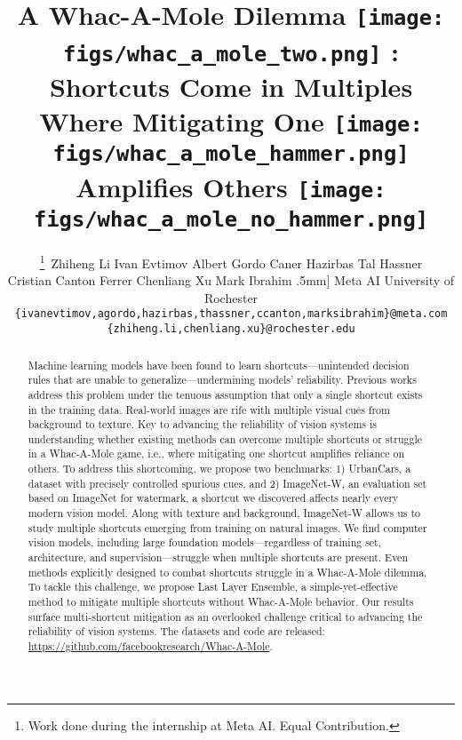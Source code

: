 \documentclass[10pt,twocolumn,letterpaper]{article}
\DeclareRobustCommand{\mole}{\begingroup\normalfont
  \texttt{[image: figs/whac\_a\_mole\_two.png]}\endgroup
}
\DeclareRobustCommand{\molehammer}{\begingroup\normalfont
  \texttt{[image: figs/whac\_a\_mole\_hammer.png]}\endgroup
}
\DeclareRobustCommand{\molenohammer}{\begingroup\normalfont
  \texttt{[image: figs/whac\_a\_mole\_no\_hammer.png]}\endgroup
}
\begin{document}
\title{
\vspace{-11mm} A Whac-A-Mole Dilemma \mole:\\
Shortcuts Come in Multiples Where Mitigating One \molehammer{} Amplifies Others \molenohammer  \vspace{-6mm}
}

\author{
\thanks{Work done during the internship at Meta AI. Equal Contribution.}~Zhiheng Li
\quad Ivan Evtimov
\quad Albert Gordo
\quad Caner Hazirbas
\quad Tal Hassner \\
Cristian Canton Ferrer
\quad Chenliang Xu
\quad Mark Ibrahim \0.5mm]
Meta AI \quad University of Rochester \\
{\tt\small \{ivanevtimov,agordo,hazirbas,thassner,ccanton,marksibrahim\}@meta.com} \\
{\tt\small \{zhiheng.li,chenliang.xu\}@rochester.edu} \vspace{-5mm}
}
\maketitle




\begin{abstract}
Machine learning models have been found to learn shortcuts---unintended decision rules that are unable to generalize---undermining models' reliability. Previous works address this problem under the tenuous assumption that only a single shortcut exists in the training data. Real-world images are rife with multiple visual cues from background to texture. Key to advancing the reliability of vision systems is understanding whether existing methods can overcome multiple shortcuts or struggle in a Whac-A-Mole game, i.e., where mitigating one shortcut amplifies reliance on others. To address this shortcoming, we propose two benchmarks: 1) UrbanCars, a dataset with precisely controlled spurious cues, and 2) ImageNet-W, an evaluation set based on ImageNet for watermark, a shortcut we discovered affects nearly every modern vision model. Along with texture and background, ImageNet-W allows us to study multiple shortcuts emerging from training on natural images. We find computer vision models, including large foundation models---regardless of training set, architecture, and supervision---struggle when multiple shortcuts are present. Even methods explicitly designed to combat shortcuts struggle in a Whac-A-Mole dilemma. To tackle this challenge, we propose Last Layer Ensemble, a simple-yet-effective method to mitigate multiple shortcuts without Whac-A-Mole behavior. Our results surface multi-shortcut mitigation as an overlooked challenge critical to advancing the reliability of vision systems. The datasets and code are released: \url{https://github.com/facebookresearch/Whac-A-Mole}.
\end{abstract}
\end{document}
